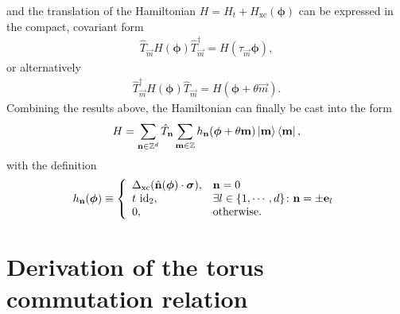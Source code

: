 \documentclass[
    10pt,
    aps,
    prb,
    twocolumn,
    floatfix,
    superscriptaddress,
]{revtex4-2}
\begin{document}
and the translation of the Hamiltonian $H = H_t + H_\mathrm{xc}(\boldsymbol{\phi})$ can  be expressed in the compact, covariant form
\begin{align}
\hat{T}_\vec{m}	H( \boldsymbol{\phi} )\hat{T}_\vec{m}^\dagger
 = H( \tau_\vec{m}\boldsymbol{\phi} ) ,
\end{align}
or alternatively
\begin{align}
	\hat{T}_\vec{m}^\dagger	H( \boldsymbol{\phi} )\hat{T}_\vec{m}
	 = H( \boldsymbol{\phi} +  \theta\vec{m} ) .
	\end{align}
Combining the results above, the Hamiltonian can finally be cast into the form
\begin{equation}
	H =  \sum_{\mathbf{n} \in \mathbb{Z}^d} \hat{T}_{\mathbf{n}}  \sum_{\mathbf{m} \in \mathbb{Z}} h_{\mathbf{n}}(  \boldsymbol{\phi} + \theta \mathbf{m}  ) \ket{ \mathbf{m}} \bra{ \mathbf{m}} ,
\end{equation}
with the definition
\begin{equation}
	h_{\mathbf{n}}(  \boldsymbol{\phi} )
	\equiv
	\left\lbrace
	\begin{array}{ll}
		\Delta_\mathrm{xc} (\hat{\mathbf{n}} ( \boldsymbol{\phi}) \cdot \boldsymbol{\sigma}) , & \mathbf{n} = 0  \\
		t~\mathrm{id}_2, & \exists l \in \lbrace 1,\cdots,d \rbrace\colon \mathbf{n} = \pm\mathbf{e}_l \\
		0, & \text{otherwise.}
		\end{array}
	\right.
\end{equation}


\section{Derivation of the torus commutation relation}
\label{app:commutation_relations}
\end{document}
